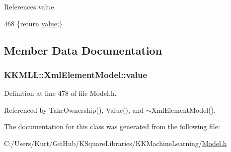 References value.


\begin{DoxyCode}
468 \{\textcolor{keywordflow}{return} \hyperlink{class_k_k_m_l_l_1_1_xml_element_model_a8b03ebd4ceb581f5047f6b12eb8fc141}{value};\}
\end{DoxyCode}


\subsection{Member Data Documentation}
\subsubsection[{\texorpdfstring{value}{value}}]{ K\+K\+M\+L\+L\+::\+Xml\+Element\+Model\+::value\hspace{0.3cm}{\ttfamily [protected]}}\hypertarget{class_k_k_m_l_l_1_1_xml_element_model_a8b03ebd4ceb581f5047f6b12eb8fc141}{}\label{class_k_k_m_l_l_1_1_xml_element_model_a8b03ebd4ceb581f5047f6b12eb8fc141}


Definition at line 478 of file Model.\+h.



Referenced by Take\+Ownership(), Value(), and $\sim$\+Xml\+Element\+Model().



The documentation for this class was generated from the following file\+:\begin{DoxyCompactItemize}
\item 
C\+:/\+Users/\+Kurt/\+Git\+Hub/\+K\+Square\+Libraries/\+K\+K\+Machine\+Learning/\hyperlink{_model_8h}{Model.\+h}\end{DoxyCompactItemize}
